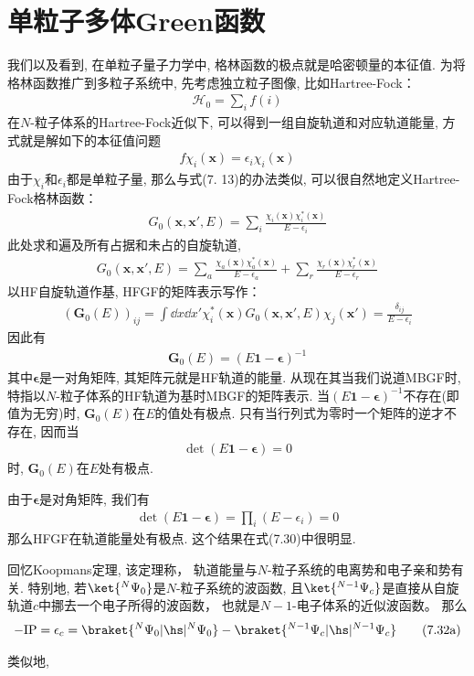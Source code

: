 \section{单粒子多体Green函数}
我们以及看到, 
在单粒子量子力学中, 
格林函数的极点就是哈密顿量的本征值. 
为将格林函数推广到多粒子系统中, 
先考虑独立粒子图像, 
比如Hartree-Fock：
\begin{align}
\mathscr{H}_0 = \sum_i f(i)
\end{align} 
在$N$-粒子体系的Hartree-Fock近似下, 
可以得到一组自旋轨道和对应轨道能量, 
方式就是解如下的本征值问题
\begin{align}
f\chi_i(\mathbf{x}) = \epsilon_i\chi_i(\mathbf{x})
\end{align}
由于$\chi_i$和$\epsilon_i$都是单粒子量, 
那么与式(7.
13)的办法类似, 
可以很自然地定义Hartree-Fock格林函数：
\begin{align}
G_0(\mathbf{x,x'},E) = \sum_i \frac{\chi_i(\mathbf{x})\chi_i^*(\mathbf{x})}{E-\epsilon_i}
\end{align}
此处求和遍及所有占据和未占的自旋轨道,
\begin{align}
G_0(\mathbf{x,x'},E) = \sum_a \frac{\chi_a(\mathbf{x})\chi_a^*(\mathbf{x})}{E-\epsilon_a} + \sum_r \frac{\chi_r(\mathbf{x})\chi_r^*(\mathbf{x})}{E-\epsilon_r}
\end{align}
以HF自旋轨道作基, 
HFGF的矩阵表示写作：
\begin{align}\label{7.30}
(\mathbf{G}_0(E))_{ij} = \int\dd{x}\dd{x'}\chi_i^*(\mathbf{x})G_0(\mathbf{x,x'},E)\chi_j(\mathbf{x'}) = \frac{\delta_{ij}}{E - \epsilon_i}
\end{align}
因此有
\begin{align}\label{7.31}
\mathbf{G}_0(E) = (E\mathbf{1} - \bm{\epsilon})^{-1}
\end{align}
其中$\bm{\epsilon}$是一对角矩阵, 
其矩阵元就是HF轨道的能量. 
从现在其当我们说道MBGF时, 
特指以$N$-粒子体系的HF轨道为基时MBGF的矩阵表示. 
 当$(E\bm{1-\epsilon})^{-1}$不存在(即值为无穷)时, 
$\mathbf{G}_0(E)$在$E$的值处有极点. 
只有当行列式为零时一个矩阵的逆才不存在, 
因而当
\begin{align*}
\det(E\bm{1-\epsilon})=0
\end{align*}
时, 
$\mathbf{G}_0(E)$在$E$处有极点.


由于$\bm{\epsilon}$是对角矩阵, 
我们有
\begin{align*}
\det(E\bm{1-\epsilon}) = \prod_i (E-\epsilon_i) = 0
\end{align*}
那么HFGF在\hft 轨道能量处有极点. 
这个结果在式(7.30)中很明显.


回忆Koopmans定理, 
该定理称，
轨道能量与$N$-粒子系统的电离势和电子亲和势有关. 
特别地, 
若$\ket{{}^N\Psi_0}$是$N$-粒子系统的\hft 波函数, 
且$\ket{{}^{N-1}\Psi_c}$是直接从自旋轨道$c$中挪去一个电子所得的波函数，
也就是$N-1$-电子体系的近似波函数。
那么
\begin{align}
-\mathrm{IP} = \epsilon_c = \braket{{}^N\Psi_0|\hs|{}^{N}\Psi_0} - \braket{{}^{N-1}\Psi_c|\hs|{}^{N-1}\Psi_c}\tag{7.32a}
\end{align}
\addtocounter{equation}{1}
类似地,

